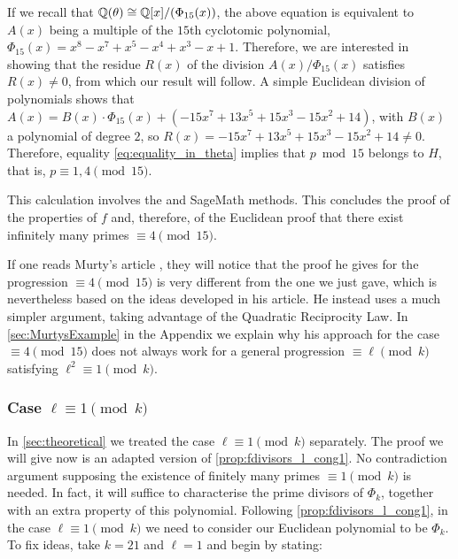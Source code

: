 \documentclass[../main.tex]{subfiles}
\begin{document}
  \begin{mdframed}\small
	If we recall that $\mathbb{Q}(\theta)\cong\mathbb{Q}[x]/(\Phi_{15}(x))$, the above equation is equivalent to $A(x)$ being a multiple of the $15$th cyclotomic polynomial, $\Phi_{15}(x) = x^{8} - x^{7} + x^{5} - x^{4} + x^{3} - x + 1$. Therefore, we are interested in showing that the residue $R(x)$ of the division $A(x)/\Phi_{15}(x)$ satisfies $R(x)\neq 0$, from which our result will follow. A simple Euclidean division of polynomials shows that $A(x)=B(x)\cdot\Phi_{15}(x)+(-15 x^{7} + 13 x^{5} + 15 x^{3} - 15 x^{2} + 14)$, with $B(x)$ a polynomial of degree $2$, so $R(x)=-15 x^{7} + 13 x^{5} + 15 x^{3} - 15 x^{2} + 14 \neq 0$. Therefore, equality \cref{eq:equality_in_theta} implies that $p \bmod{15}$ belongs to $H$, that is, $p\equiv 1,4\pmod{15}$.
\end{mdframed}

This calculation involves the \textcolor{blue}{} and \textcolor{blue}{} SageMath methods. This concludes the proof of the properties of $f$ and, therefore, of the Euclidean proof that there exist infinitely many primes $\equiv4 \pmod{15}$.

\begin{remark}
	If one reads Murty's article \cite{Murty}, they will notice that the proof he gives for the progression $\equiv 4\pmod{15}$ is very different from the one we just gave, which is nevertheless based on the ideas developed in his article. He instead uses a much simpler argument, taking advantage of the Quadratic Reciprocity Law. In \cref{sec:MurtysExample} in the Appendix we explain why his approach for the case $\equiv 4\pmod{15}$ does not always work for a general progression $\equiv\ell\pmod{k}$ satisfying $\ell^2\equiv 1 \pmod{k}$.
\end{remark}
 
\subsubsection{Case \texorpdfstring{$\ell\equiv 1\pmod{k}$}{l=1 (mod k)}}\label{sec:generallcong1}

In \cref{sec:theoretical} we treated the case $\ell\equiv1 \pmod{k}$ separately. The proof we will give now is an adapted version of \cref{prop:fdivisors_l_cong1}. No contradiction argument supposing the existence of finitely many primes $\equiv 1\pmod{k}$ is needed. In fact, it will suffice to characterise the prime divisors of $\Phi_k$, together with an extra property of this polynomial. Following \cref{prop:fdivisors_l_cong1}, in the case $\ell\equiv 1\pmod{k}$ we need to consider our Euclidean polynomial to be $\Phi_k$. To fix ideas, take $k=21$ and $\ell=1$ and begin by stating:\\
\end{document}
